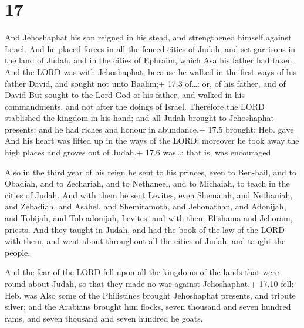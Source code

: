 \hypertarget{section-16}{%
\section{17}\label{section-16}}

 And Jehoshaphat his son reigned in his stead, and
strengthened himself against Israel.  And he placed forces
in all the fenced cities of Judah, and set garrisons in the land of
Judah, and in the cities of Ephraim, which Asa his father had taken.
 And the LORD was with Jehoshaphat, because he walked in the
first ways of his father David, and sought not unto Baalim;+ 17.3
of\ldots: or, of his father, and of David  But sought to the
Lord God of his father, and walked in his commandments, and not after
the doings of Israel.  Therefore the LORD stablished the
kingdom in his hand; and all Judah brought to Jehoshaphat presents; and
he had riches and honour in abundance.+ 17.5 brought: Heb. gave
 And his heart was lifted up in the ways of the LORD:
moreover he took away the high places and groves out of Judah.+ 17.6
was\ldots: that is, was encouraged

 Also in the third year of his reign he sent to his
princes, even to Ben-hail, and to Obadiah, and to Zechariah, and to
Nethaneel, and to Michaiah, to teach in the cities of Judah.
 And with them he sent Levites, even Shemaiah, and
Nethaniah, and Zebadiah, and Asahel, and Shemiramoth, and Jehonathan,
and Adonijah, and Tobijah, and Tob-adonijah, Levites; and with them
Elishama and Jehoram, priests.  And they taught in Judah,
and had the book of the law of the LORD with them, and went about
throughout all the cities of Judah, and taught the people.

 And the fear of the LORD fell upon all the kingdoms of
the lands that were round about Judah, so that they made no war against
Jehoshaphat.+ 17.10 fell: Heb. was  Also some of the
Philistines brought Jehoshaphat presents, and tribute silver; and the
Arabians brought him flocks, seven thousand and seven hundred rams, and
seven thousand and seven hundred he goats.

